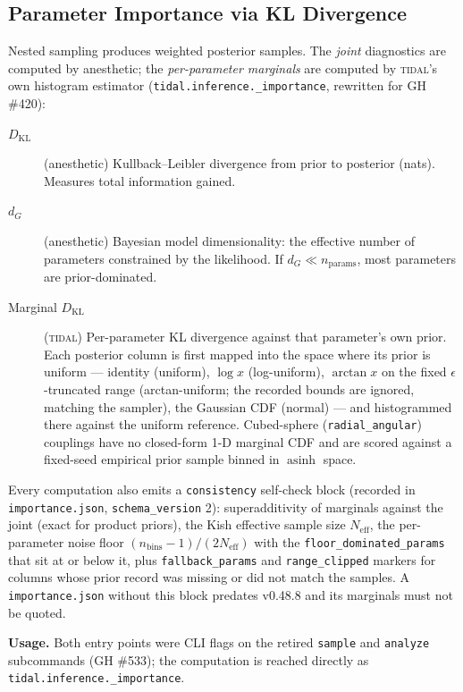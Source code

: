 \subsection{Parameter Importance via KL Divergence}
\label{sec:inference-importance}

Nested sampling produces weighted posterior samples.  The \emph{joint}
diagnostics are computed by anesthetic; the \emph{per-parameter marginals}
are computed by \textsc{tidal}'s own histogram estimator
(\texttt{tidal.inference.\_importance}, rewritten for GH \#420):

\begin{description}
  \item[$D_\mathrm{KL}$] (anesthetic) Kullback--Leibler divergence from
    prior to posterior (nats).  Measures total information gained.
  \item[$d_G$] (anesthetic) Bayesian model dimensionality: the effective
    number of parameters constrained by the likelihood.  If
    $d_G \ll n_\mathrm{params}$, most parameters are prior-dominated.
  \item[Marginal $D_\mathrm{KL}$] (\textsc{tidal}) Per-parameter KL
    divergence against that parameter's own prior.  Each posterior column
    is first mapped into the space where its prior is uniform ---
    identity (uniform), $\log x$ (log-uniform), $\arctan x$ on the fixed
    $\epsilon$-truncated range (arctan-uniform; the recorded bounds are
    ignored, matching the sampler), the Gaussian CDF (normal) --- and
    histogrammed there against the uniform reference.  Cubed-sphere
    (\texttt{radial\_angular}) couplings have no closed-form 1-D marginal
    CDF and are scored against a fixed-seed empirical prior sample binned
    in $\operatorname{asinh}$ space.
\end{description}

Every computation also emits a \texttt{consistency} self-check block
(recorded in \texttt{importance.json}, \texttt{schema\_version} 2):
superadditivity of marginals against the joint (exact for product priors),
the Kish effective sample size $N_\mathrm{eff}$, the per-parameter noise
floor $(n_\mathrm{bins}-1)/(2N_\mathrm{eff})$ with the
\texttt{floor\_dominated\_params} that sit at or below it, plus
\texttt{fallback\_params} and \texttt{range\_clipped} markers for columns
whose prior record was missing or did not match the samples.  A
\texttt{importance.json} without this block predates v0.48.8 and its
marginals must not be quoted.

\textbf{Usage.}  Both entry points were CLI flags on the retired
\texttt{sample} and \texttt{analyze} subcommands (GH \#533); the computation is
reached directly as \texttt{tidal.inference.\_importance}.

